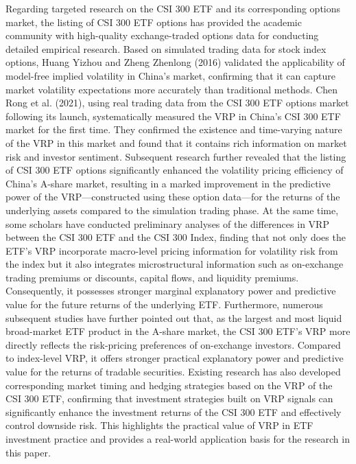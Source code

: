 \documentclass[a4paper, 12pt]{article}    %
\begin{document}
Regarding targeted research on the CSI 300 ETF and its corresponding options market, the listing of CSI 300 ETF options has provided the academic community with high-quality exchange-traded options data for conducting detailed empirical research. Based on simulated trading data for stock index options, Huang Yizhou and Zheng Zhenlong (2016) validated the applicability of model-free implied volatility in China’s market, confirming that it can capture market volatility expectations more accurately than traditional methods. Chen Rong et al. (2021), using real trading data from the CSI 300 ETF options market following its launch, systematically measured the VRP in China’s CSI 300 ETF market for the first time. They confirmed the existence and time-varying nature of the VRP in this market and found that it contains rich information on market risk and investor sentiment. Subsequent research further revealed that the listing of CSI 300 ETF options significantly enhanced the volatility pricing efficiency of China’s A-share market, resulting in a marked improvement in the predictive power of the VRP—constructed using these option data—for the returns of the underlying assets compared to the simulation trading phase. At the same time, some scholars have conducted preliminary analyses of the differences in VRP between the CSI 300 ETF and the CSI 300 Index, finding that not only does the ETF's VRP incorporate macro-level pricing information for volatility risk from the index but it also integrates microstructural information such as on-exchange trading premiums or discounts, capital flows, and liquidity premiums. Consequently, it possesses stronger marginal explanatory power and predictive value for the future returns of the underlying ETF. Furthermore, numerous subsequent studies have further pointed out that, as the largest and most liquid broad-market ETF product in the A-share market, the CSI 300 ETF’s VRP more directly reflects the risk-pricing preferences of on-exchange investors. Compared to index-level VRP, it offers stronger practical explanatory power and predictive value for the returns of tradable securities. Existing research has also developed corresponding market timing and hedging strategies based on the VRP of the CSI 300 ETF, confirming that investment strategies built on VRP signals can significantly enhance the investment returns of the CSI 300 ETF and effectively control downside risk. This highlights the practical value of VRP in ETF investment practice and provides a real-world application basis for the research in this paper.
\end{document}
